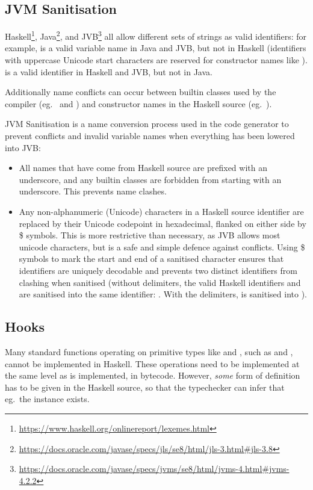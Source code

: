\documentclass[dissertation.tex]{subfiles}
\begin{document}
{    \subsection{JVM Sanitisation}\label{sec:jvm-sanitisation}
    {
        Haskell\footnote{\url{https://www.haskell.org/onlinereport/lexemes.html}}, Java\footnote{\url{https://docs.oracle.com/javase/specs/jls/se8/html/jls-3.html\#jls-3.8}}, and JVB\footnote{\url{https://docs.oracle.com/javase/specs/jvms/se8/html/jvms-4.html\#jvms-4.2.2}} all allow different sets of strings as valid identifiers: for example,  is a valid variable name in Java and JVB, but not in Haskell (identifiers with uppercase Unicode start characters are reserved for constructor names like ). \monospace{(+)} is a valid identifier in Haskell and JVB, but not in Java.

        Additionally name conflicts can occur between builtin classes used by the compiler (eg.\  and ) and constructor names in the Haskell source (eg.\ ).

        JVM Sanitisation is a name conversion process used in the code generator to prevent conflicts and invalid variable names when everything has been lowered into JVB:

        \begin{itemize}
        \item
        {
            All names that have come from Haskell source are prefixed with an underscore, and any builtin classes are forbidden from starting with an underscore. This prevents name clashes.
        }
        \item
        {
            Any non-alphanumeric (Unicode) characters in a Haskell source identifier are replaced by their Unicode codepoint in hexadecimal, flanked on either side by \$ symbols. This is more restrictive than necessary, as JVB allows most unicode characters, but is a safe and simple defence against conflicts. Using \$ symbols to mark the start and end of a sanitised character ensures that identifiers are uniquely decodable and prevents two distinct identifiers from clashing when sanitised (without delimiters, the valid Haskell identifiers \haskell{#\(\pi\)#} and  are sanitised into the same identifier: . With the delimiters, \haskell{#\(\pi\)#} is sanitised into ).
        }
        \end{itemize}
    }
    \subsection{Hooks}\label{sec:hooks}
    {
        Many standard functions operating on primitive types like  and , such as \haskell{(+)} and \haskell{(==)}, cannot be implemented in Haskell. These operations need to be implemented at the same level as  is implemented, in bytecode. However, \textit{some} form of definition has to be given in the Haskell source, so that the typechecker can infer that eg.\ the instance exists.

}}
\end{document}
